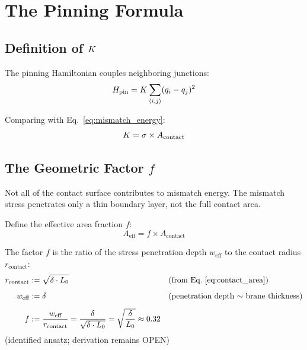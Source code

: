 \section{The Pinning Formula}
\label{sec:sigmaK:formula}

\subsection{Definition of $K$}

The pinning Hamiltonian couples neighboring junctions:
\begin{equation}
    H_{\text{pin}} = K \sum_{\langle i,j \rangle} (q_i - q_j)^2
    \label{eq:H_pin}
\end{equation}

Comparing with Eq.~\eqref{eq:mismatch_energy}:
\begin{equation}
    K = \sigma \times A_{\text{contact}}
\end{equation}

\subsection{The Geometric Factor $f$}

Not all of the contact surface contributes to mismatch energy. The mismatch
stress penetrates only a thin boundary layer, not the full contact area.

\begin{derivationbox}[title=Effective Area and $f$ Factor]
    Define the effective area fraction $f$:
    \begin{equation}
        A_{\text{eff}} = f \times A_{\text{contact}}
    \end{equation}

    The factor $f$ is the ratio of the stress penetration depth $w_{\text{eff}}$
    to the contact radius $r_{\text{contact}}$:
    \begin{align}
        r_{\text{contact}} &:= \sqrt{\delta \cdot L_0}
            && \text{(from Eq.~\eqref{eq:contact_area})} \\[0.5em]
        w_{\text{eff}} &:= \delta
            && \text{(penetration depth $\sim$ brane thickness)} \\[0.5em]
        f &:= \frac{w_{\text{eff}}}{r_{\text{contact}}}
            = \frac{\delta}{\sqrt{\delta \cdot L_0}}
            = \sqrt{\frac{\delta}{L_0}}
            \approx 0.32
        \label{eq:f_factor}
    \end{align}
    \tagI{} (identified ansatz; derivation remains OPEN)
\end{derivationbox}

